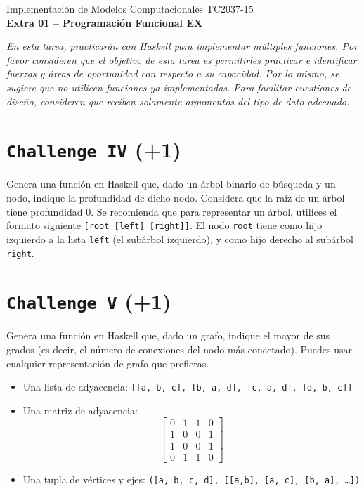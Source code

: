 \documentclass[]{article}
\theoremstyle{definition}
\begin{document}
\begin{center}
{\huge Implementación de Modelos Computacionales TC2037-15}\\[1.5ex]
{\large \textbf{Extra 01 -- Programación Funcional EX}\\[1.5ex] %
} %
\end{center}

\vspace{0.2 cm}

{\footnotesize \textit{En esta tarea, practicarán con Haskell para implementar múltiples funciones. Por favor consideren que el objetivo de esta tarea es permitirles practicar e identificar fuerzas y áreas de oportunidad con respecto a su capacidad. Por lo mismo, se sugiere que no utilicen funciones ya implementadas. Para facilitar cuestiones de diseño, consideren que reciben solamente argumentos del tipo de dato adecuado.}}

\section{\texttt{Challenge IV} (+1)}

Genera una función en Haskell que, dado un árbol binario de búsqueda y un nodo, indique la profundidad de dicho nodo. Considera que la raíz de un árbol tiene profundidad 0. Se recomienda que para representar un árbol, utilices el formato siguiente \texttt{[root [left] [right]]}. El nodo \texttt{root} tiene como hijo izquierdo a la lista \texttt{left} (el subárbol izquierdo), y como hijo derecho al subárbol \texttt{right}.

\bigskip

\section{\texttt{Challenge V} (+1)}

Genera una función en Haskell que, dado un grafo, indique el mayor de sus grados (es decir, el número de conexiones del nodo más conectado). Puedes usar cualquier representación de grafo que prefieras.

\begin{itemize}
	\item Una lista de adyacencia: \texttt{[[a, b, c], [b, a, d], [c, a, d], [d, b, c]]}
	\item Una matriz de adyacencia: $$\begin{bmatrix}
		0 & 1 & 1 & 0\\
		1 & 0 & 0 & 1\\
		1 & 0 & 0 & 1\\
		0 & 1 & 1 & 0
	\end{bmatrix}$$
	\item Una tupla de vértices y ejes: \texttt{([a, b, c, d], [[a,b], [a, c], [b, a], \dots])}
\end{itemize}
\end{document}
